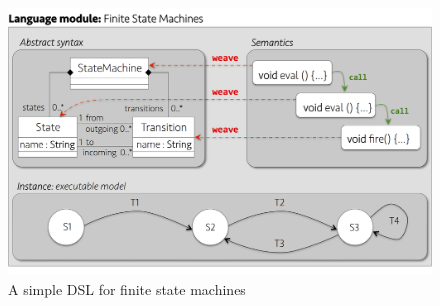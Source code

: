 \begin{figure}
\centering
\includegraphics[width=1\linewidth]{images/fig-dsl-example.png}
\caption{A simple DSL for finite state machines}
\label{fig:fig-dsl-example}
\end{figure}